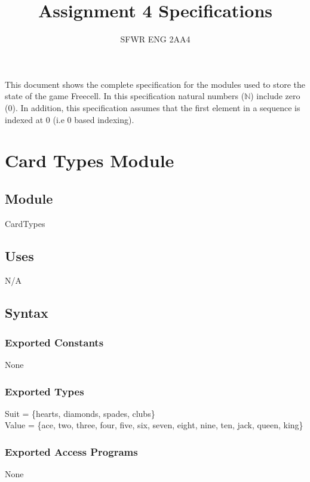 \documentclass[12pt]{article}
\title{Assignment 4 Specifications}
\author{SFWR ENG 2AA4}
\begin{document}
\maketitle

This
document shows the complete specification for the modules used to store the state of the game Freecell.  In this specification natural numbers
($\mathbb{N}$) include zero ($0$). In addition, this specification assumes that the first element in a sequence is indexed at 0 (i.e 0 based indexing).

\newpage

\section* {Card Types Module}

\subsection*{Module}

CardTypes

\subsection* {Uses}

N/A

\subsection* {Syntax}

\subsubsection* {Exported Constants}

None

\subsubsection* {Exported Types}

Suit = \{hearts, diamonds, spades, clubs\}\\
Value = \{ace, two, three, four, five, six, seven, eight, nine, ten, jack, queen, king\}

\subsubsection* {Exported Access Programs}

None
\end{document}
